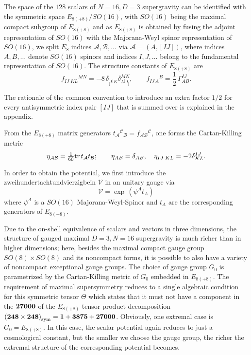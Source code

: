 \documentclass[a4paper,12pt]{article}
\begin{document}
The space of the $128$ scalars of $N=16, D=3$ supergravity can be
identified with the symmetric space $E_{8(+8)}/SO(16)$, with $SO(16)$
being the maximal compact subgroup of $E_{8(+8)}$ and
as $E_{8(+8)}$ is obtained by fusing the adjoint representation of
$SO(16)$ with the Majorana-Weyl spinor representation of $SO(16)$, we
split $E_8$ indices $\mathcal{A}, \mathcal{B},\ldots$ via
$\mathcal{A}=(A,[IJ])$, where indices $A,B,\ldots$ denote $SO(16)$
spinors and indices $I,J,\ldots$ belong to the fundamental
representation of $SO(16)$. The structure constants of $E_{8(+8)}$ are
\begin{equation}
f_{IJ\;KL}{}^{MN}=-8\,\delta_{{}_[I{}^[K}^{\phantom{MN}}\delta_{L{}^]J{}_]}^{MN},\qquad
f_{IJ\,A}{}^{B}={\textstyle \frac{1}{2}}\,\Gamma^{IJ}_{AB}.
\end{equation}

The rationale of the common convention to introduce an extra factor
$1/2$ for every antisymmetric index pair $[IJ]$ that is summed over is
explained in the appendix.

From the $E_{8(+8)}$ matrix generators
$t_\mathcal{A}{}^{\mathcal{C}}{}_{\mathcal{B}}=f_{\mathcal{A}\mathcal{B}}{}^{\mathcal{C}}$,
one forms the Cartan-Killing metric
\begin{equation}
\eta_{\mathcal{A}\mathcal{B}}={\textstyle \frac{1}{60}}\mbox{tr}\,t_\mathcal{A}t_\mathcal{B};\qquad\eta_{AB}=\delta_{AB},\quad\eta_{IJ\;KL}=-2\delta^{IJ}_{KL}.
\end{equation}


In order to obtain the potential, we first introduce the
zwei\-hundert\-achtund\-vierzig\-bein $\mathcal{V}$ in an
unitary gauge via
\begin{equation}
\mathcal{V}=\exp\,\left(\psi^A t_A\right)
\end{equation}
where $\psi^A$ is a $SO(16)$ Majorana-Weyl-Spinor and
$t_A$ are the corresponding generators of $E_{8(+8)}$.

Due to the on-shell equivalence of scalars and vectors in three
dimensions, the structure of gauged maximal $D=3, N=16$ supergravity
is much richer than in higher dimensions; here, besides the maximal
compact gauge group $SO(8)\times SO(8)$ and its noncompact forms, it
is possible to also have a variety of noncompact exceptional gauge groups.
The choice of gauge group $G_0$ is parametrized by the Cartan-Killing
metric of $G_0$ embedded in $E_{8(+8)}$. The requirement of maximal
supersymmetry reduces to a single algebraic condition for this
symmetric tensor $\Theta$ which states that it must not have a
component in the ${\bf 27000}$ of the $E_{8(+8)}$ tensor product
decomposition $\left({\bf 248}\times {\bf 248}\right)_{\rm sym}={\bf 1}+{\bf 3875}+{\bf 27000}$.
Obviously, one extremal case is $G_0=E_{8(+8)}$. In this case, the scalar potential
again reduces to just a cosmological constant, but the smaller we
choose the gauge group, the richer the extremal structure of the
corresponding potential becomes.
\end{document}
